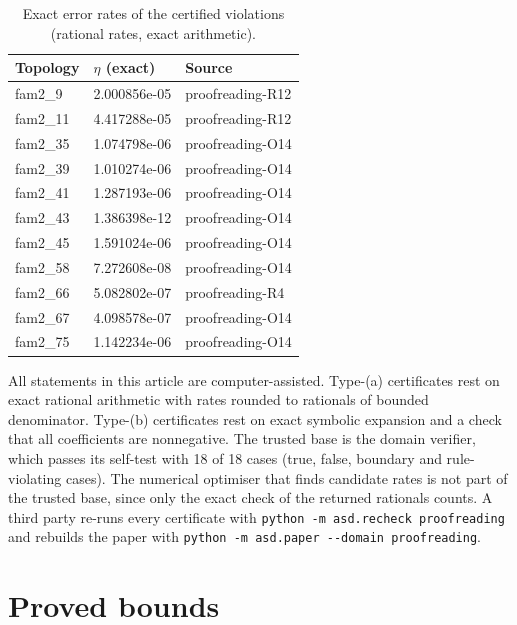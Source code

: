 \documentclass[10pt,twocolumn]{article}
\theoremstyle{definition}\newtheorem{definition}{Definition}\newtheorem{example}{Example}
\begin{document}
\begin{table}[t]\centering\footnotesize
\caption{Exact error rates of the certified violations (rational rates, exact arithmetic).}
\begin{tabular}{@{}lll@{}}
\toprule
Topology & \(\eta\) (exact) & Source \\
\midrule
fam2\_9 & 2.000856e-05 & proofreading-R12 \\
fam2\_11 & 4.417288e-05 & proofreading-R12 \\
fam2\_35 & 1.074798e-06 & proofreading-O14 \\
fam2\_39 & 1.010274e-06 & proofreading-O14 \\
fam2\_41 & 1.287193e-06 & proofreading-O14 \\
fam2\_43 & 1.386398e-12 & proofreading-O14 \\
fam2\_45 & 1.591024e-06 & proofreading-O14 \\
fam2\_58 & 7.272608e-08 & proofreading-O14 \\
fam2\_66 & 5.082802e-07 & proofreading-R4 \\
fam2\_67 & 4.098578e-07 & proofreading-O14 \\
fam2\_75 & 1.142234e-06 & proofreading-O14 \\
\bottomrule
\end{tabular}
\end{table}


\begin{remark}
All statements in this article are computer-assisted. Type-(a) certificates rest on exact rational arithmetic with rates rounded to rationals of bounded denominator. Type-(b) certificates rest on exact symbolic expansion and a check that all coefficients are nonnegative. The trusted base is the domain verifier, which passes its self-test with 18 of 18 cases (true, false, boundary and rule-violating cases). The numerical optimiser that finds candidate rates is not part of the trusted base, since only the exact check of the returned rationals counts. A third party re-runs every certificate with \texttt{python\ -m\ asd.recheck\ proofreading} and rebuilds the paper with \texttt{python\ -m\ asd.paper\ -\/-domain\ proofreading}.
\end{remark}

\section{Proved bounds}\label{proved-bounds}
\end{document}

